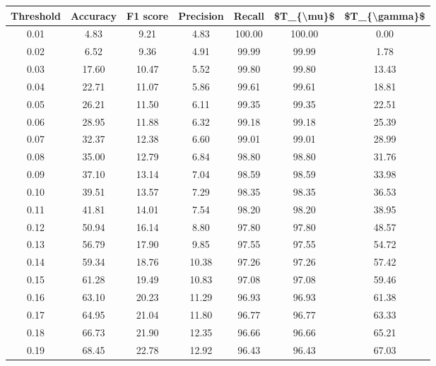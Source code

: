 \begin{tabular}{|c|c|c|c|c|c|c|}
\toprule
 Threshold &  Accuracy &  F1 score &  Precision &  Recall &  \$T\_\{\textbackslash mu\}\$ &  \$T\_\{\textbackslash gamma\}\$ \\
\hline
      0.01 &      4.83 &      9.21 &       4.83 &  100.00 &     100.00 &          0.00 \\
      0.02 &      6.52 &      9.36 &       4.91 &   99.99 &      99.99 &          1.78 \\
      0.03 &     17.60 &     10.47 &       5.52 &   99.80 &      99.80 &         13.43 \\
      0.04 &     22.71 &     11.07 &       5.86 &   99.61 &      99.61 &         18.81 \\
      0.05 &     26.21 &     11.50 &       6.11 &   99.35 &      99.35 &         22.51 \\
      0.06 &     28.95 &     11.88 &       6.32 &   99.18 &      99.18 &         25.39 \\
      0.07 &     32.37 &     12.38 &       6.60 &   99.01 &      99.01 &         28.99 \\
      0.08 &     35.00 &     12.79 &       6.84 &   98.80 &      98.80 &         31.76 \\
      0.09 &     37.10 &     13.14 &       7.04 &   98.59 &      98.59 &         33.98 \\
      0.10 &     39.51 &     13.57 &       7.29 &   98.35 &      98.35 &         36.53 \\
      0.11 &     41.81 &     14.01 &       7.54 &   98.20 &      98.20 &         38.95 \\
      0.12 &     50.94 &     16.14 &       8.80 &   97.80 &      97.80 &         48.57 \\
      0.13 &     56.79 &     17.90 &       9.85 &   97.55 &      97.55 &         54.72 \\
      0.14 &     59.34 &     18.76 &      10.38 &   97.26 &      97.26 &         57.42 \\
      0.15 &     61.28 &     19.49 &      10.83 &   97.08 &      97.08 &         59.46 \\
      0.16 &     63.10 &     20.23 &      11.29 &   96.93 &      96.93 &         61.38 \\
      0.17 &     64.95 &     21.04 &      11.80 &   96.77 &      96.77 &         63.33 \\
      0.18 &     66.73 &     21.90 &      12.35 &   96.66 &      96.66 &         65.21 \\
      0.19 &     68.45 &     22.78 &      12.92 &   96.43 &      96.43 &         67.03 \\

\end{tabular}
